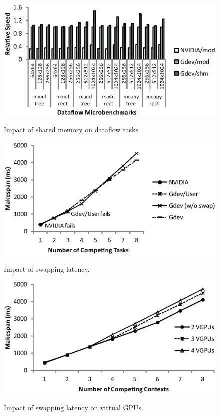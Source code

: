 \begin{figure}[t]
 \begin{center}
  \includegraphics[width=\hsize]{eps/dataflow.eps}\\
  \vspace{-1.5em}
  \caption{Impact of shared memory on dataflow tasks.}
  \label{fig:dataflow}
 \end{center}
 \vspace{-1.5em}
 \begin{center}
  \includegraphics[width=0.8\hsize]{eps/swapping.eps}\\
  \vspace{-1.5em}
  \caption{Impact of swapping latency.}
  \label{fig:swapping}
 \end{center}
 \vspace{-1.5em}
 \begin{center}
  \includegraphics[width=0.8\hsize]{eps/swapping_vgpu.eps}\\
  \vspace{-1.5em}
  \caption{Impact of swapping latency on virtual GPUs.}
  \label{fig:swapping_vgpu}
 \end{center}
 \vspace{-1.5em}
\end{figure}

